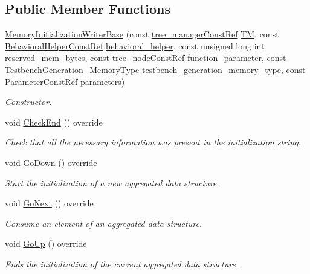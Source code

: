 \subsection*{Public Member Functions}
\begin{DoxyCompactItemize}
\item 
\hyperlink{classMemoryInitializationWriterBase_aecfe363b2187038fe689abceacb2343a}{Memory\+Initialization\+Writer\+Base} (const \hyperlink{tree__manager_8hpp_a792e3f1f892d7d997a8d8a4a12e39346}{tree\+\_\+manager\+Const\+Ref} \hyperlink{classMemoryInitializationWriterBase_ad7639a9140b8d5c42c2c0c4255ad4cbf}{TM}, const \hyperlink{behavioral__helper_8hpp_aae973b54cac87eef3b27442aa3e1e425}{Behavioral\+Helper\+Const\+Ref} \hyperlink{classMemoryInitializationWriterBase_ae5f60dc91641447c00b023836743b6b3}{behavioral\+\_\+helper}, const unsigned long int \hyperlink{classMemoryInitializationWriterBase_ac424618ba0c88d441a905b6cbf891b65}{reserved\+\_\+mem\+\_\+bytes}, const \hyperlink{tree__node_8hpp_a3cf5d02292c940f3892425a5b5fdec3c}{tree\+\_\+node\+Const\+Ref} \hyperlink{classMemoryInitializationWriterBase_a2bdd8c25a0b756f6290cb48a6b9d0303}{function\+\_\+parameter}, const \hyperlink{testbench__generation_8hpp_ad84688161fffbe7da2fc2b9a39b93198}{Testbench\+Generation\+\_\+\+Memory\+Type} \hyperlink{classMemoryInitializationWriterBase_ac4f718dfd59eddbc0adf75e98b227ccb}{testbench\+\_\+generation\+\_\+memory\+\_\+type}, const \hyperlink{Parameter_8hpp_a37841774a6fcb479b597fdf8955eb4ea}{Parameter\+Const\+Ref} parameters)
\begin{DoxyCompactList}\small\item\em Constructor. \end{DoxyCompactList}\item 
void \hyperlink{classMemoryInitializationWriterBase_a33b7ee7cf9c476b02a3f6fb1e6e22a25}{Check\+End} () override
\begin{DoxyCompactList}\small\item\em Check that all the necessary information was present in the initialization string. \end{DoxyCompactList}\item 
void \hyperlink{classMemoryInitializationWriterBase_a3ad046983ce9cfe765bcccb7ea16f47f}{Go\+Down} () override
\begin{DoxyCompactList}\small\item\em Start the initialization of a new aggregated data structure. \end{DoxyCompactList}\item 
void \hyperlink{classMemoryInitializationWriterBase_a6b67daf4f3e0a2ff88bc824c80f11ea6}{Go\+Next} () override
\begin{DoxyCompactList}\small\item\em Consume an element of an aggregated data structure. \end{DoxyCompactList}\item 
void \hyperlink{classMemoryInitializationWriterBase_a0ff1c989969769e131c36172cc3f8ce3}{Go\+Up} () override
\begin{DoxyCompactList}\small\item\em Ends the initialization of the current aggregated data structure. \end{DoxyCompactList}\end{DoxyCompactItemize}
